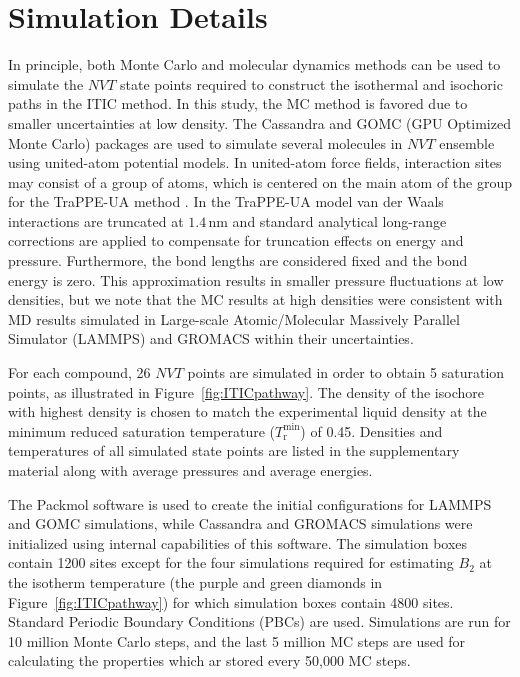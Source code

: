 \documentclass[5p,times]{elsarticle}
\begin{document}
\section{Simulation Details} \label{sec:SimDetail}
In principle, both Monte Carlo and molecular dynamics methods can be used to simulate the $NVT$ state points required to construct the isothermal and isochoric paths in the ITIC method. In this study, the MC method is favored due to smaller uncertainties at low density. The Cassandra \cite{Shah2017} and GOMC (GPU Optimized Monte Carlo) \cite{Mick2013} packages are used to simulate several molecules in $NVT$ ensemble using united-atom potential models. In united-atom force fields, interaction sites may consist of a group of atoms, which is centered on the main atom of the group for the TraPPE-UA method \cite{Smit1998}. In the TraPPE-UA model van der Waals interactions are truncated at $1.4\,\mathrm{nm}$ and standard analytical long-range corrections are applied to compensate for truncation effects on energy and pressure\cite{allen2017}. Furthermore, the bond lengths are considered fixed and the bond energy is zero. This approximation results in smaller pressure fluctuations at low densities, but we note that the MC results at high densities were consistent with MD results simulated in Large-scale Atomic/Molecular Massively Parallel Simulator (LAMMPS) \cite{Plimpton2007} and GROMACS \cite{Lindahl2001} within their uncertainties.

For each compound, 26 $NVT$ points are simulated in order to obtain 5 saturation points, as illustrated in Figure~\ref{fig:ITICpathway}. The density of the isochore with highest density is chosen to match the experimental liquid density at the minimum reduced saturation temperature ($T_\mathrm{r}^\mathrm{min}$) of 0.45. Densities and temperatures of all simulated state points are listed in the supplementary material along with average pressures and average energies.

The Packmol \cite{martinez2009packmol} software is used to create the initial configurations for LAMMPS and GOMC simulations, while Cassandra and GROMACS simulations were initialized using internal capabilities of this software. The simulation boxes contain 1200 sites except for the four simulations required for estimating $B_2$ at the isotherm temperature (the purple and green diamonds in Figure~\ref{fig:ITICpathway}) for which simulation boxes contain 4800 sites. Standard Periodic Boundary Conditions (PBCs) are used. Simulations are run for 10 million Monte Carlo steps, and the last 5 million MC steps are used for calculating the properties which ar stored every 50,000 MC steps. 
\end{document}
